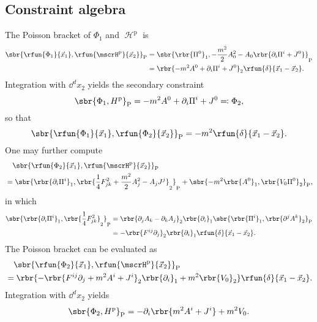 \documentclass[a4paper,11pt]{article}
\begin{document}
\subsection{Constraint algebra}
The Poisson bracket of $\Phi_1$ and $\mscrH^\text{p}$ is
\begin{align}
\sbr{\rfun{\Phi_1}{\vec{x}_1},\rfun{\mscrH^\text{p}}{\vec{x}_2}}_\text{P} &=
\sbr{\rbr{\Pi^0}_1,
-\frac{m^2}{2}A_0^2-A_0\rbr{\partial_i \Pi^i + J^0}}_\text{P}
\nonumber \\
&= \rbr{-m^2 A^0 + \partial_i \Pi^i + J^0}_2 
\rfun{\delta}{\vec{x}_1-\vec{x}_2}.
\end{align}
Integration with $\dd^d x_2$ yields the secondary constraint
\begin{equation}
\sbr{\Phi_1, H^\text{p}}_\text{P} = -m^2 A^0 + \partial_i \Pi^i + J^0 
\eqqcolon \Phi_2,
\label{eq:secondary-general-MP}
\end{equation}
so that
\begin{equation}
\sbr{\rfun{\Phi_1}{\vec{x}_1},\rfun{\Phi_2}{\vec{x}_2}}_\text{P} = 
-m^2\rfun{\delta}{\vec{x}_1-\vec{x}_2}.
\label{eq:Maxwell-Proca-Q}
\end{equation}
One may further compute
\begin{align}
&\quad\sbr{\rfun{\Phi_2}{\vec{x}_1}, 
\rfun{\mscrH^\text{p}}{\vec{x}_2}}_\text{P} \nonumber \\
&= \sbr{\rbr{\partial_i \Pi^i}_1,
\rbr{\frac{1}{4} F_{jk}^2 + \frac{m^2}{2} A_j^2 - A_j J^j}_2}_\text{P} 
+ \sbr{-m^2 \rbr{A^0}_1, \rbr{V_0 \Pi^0}_2}_\text{P},
\end{align}
in which
\begin{align}
\sbr{\rbr{\partial_i \Pi^i}_1, \rbr{\frac{1}{4} 
F_{jk}^2}_2}_\text{P} &=
\rbr{\partial_j A_k - \partial_k A_j}_2 \rbr{\partial_i}_1
\sbr{\rbr{\Pi^i}_1, \rbr{\partial^j A^k}_2}_\text{P} \nonumber \\
&= -\rbr{F^{ij} \partial_j}_2 \rbr{\partial_i}_1
\rfun{\delta}{\vec{x}_1-\vec{x}_2}.
\end{align}
The Poisson bracket can be evaluated as
\begin{align}
&\quad \sbr{\rfun{\Phi_2}{\vec{x}_1}, 
\rfun{\mscrH^\text{p}}{\vec{x}_2}}_\text{P} \\
&= \rbr{-\rbr{F^{ij} \partial_j + m^2 A^i + J^i}_2 \rbr{\partial_i}_1 + m^2
\rbr{V_0}_2}
\rfun{\delta}{\vec{x}_1-\vec{x}_2}.
\end{align}
Integration with $\dd^d x_2$ yields
\begin{equation}
\sbr{\Phi_2, H^\text{p}}_\text{P} = -\partial_i\rbr{m^2 A^i + J^i} + m^2 V_0.
\label{eq:persistence-Phi2}
\end{equation}
\end{document}
